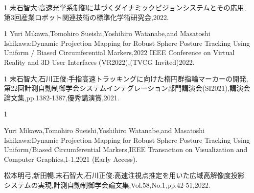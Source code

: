 \begin{招待講演}{1}
末石智大:高速光学系制御に基づくダイナミックビジョンシステムとその応用,第3回産業ロボット関連技術の標準化学術研究会,2022.

\end{招待講演}

\begin{招待論文}{1}
Yuri Mikawa,Tomohiro Sueishi,Yoshihiro Watanabe,and Masatoshi Ishikawa:Dynamic Projection Mapping for Robust Sphere Posture Tracking Using Uniform / Biased Circumferential Markers,2022 IEEE Conference on Virtual Reality and 3D User Interfaces (VR2022),(TVCG Invited)2022.

\end{招待論文}

\begin{受賞}{1}
末石智大,石川正俊:手指高速トラッキングに向けた楕円群指輪マーカーの開発,第22回計測自動制御学会システムインテグレーション部門講演会(SI2021),講演会論文集,pp.1382-1387,優秀講演賞,2021.

\end{受賞}

\begin{雑誌論文}{1}

Yuri Mikawa,Tomohiro Sueishi,Yoshihiro Watanabe,and Masatoshi Ishikawa:Dynamic Projection Mapping for Robust Sphere Posture Tracking Using Uniform/Biased Circumferential Markers,IEEE Transaction on Visualization and Computer Graphics,1-1,2021 (Early Access).

松本明弓,新田暢,末石智大,石川正俊:高速注視点推定を用いた広域高解像度投影システムの実現,計測自動制御学会論文集,Vol.58,No.1,pp.42-51,2022.

\end{雑誌論文}

